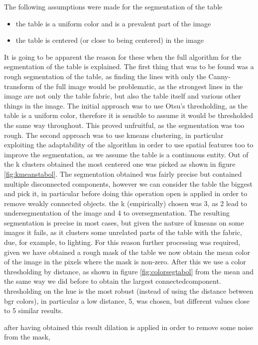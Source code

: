 The following assumptions were made for the segmentation of the table
\begin{itemize}
    \item the table is a uniform color and is a prevalent part of the image
    \item the table is centered (or close to being centered) in the image
\end{itemize}

It is going to be apparent the reason for these when the full algorithm for
the segmentation of the table is explained.
The first thing that was to be found was a rough segmentation of the table,
as finding the lines with only the Canny-transform of the full image would 
be problematic, as the strongest lines in the image are not only the table
fabric, but also the table itself and various other things in the image.
The initial approach was to use Otsu's thresholding, as the table is a uniform
color, therefore it is sensible to assume it would be thresholded the same
way throughout. This proved unfruitful, as the segmentation was too rough.
The second approach was to use kmeans clustering, in particular exploiting the
adaptability of the algorithm in order to use spatial features too to improve
the segmentation, as we assume the table is a continuous entity. Out of the k clusters obtained the most centered one was picked as shown in figure \ref{fig:kmeanstabol}.
The segmentation obtained was fairly precise but contained multiple disconnected
components, however we can consider the table the biggest and pick it, in particular
before doing this operation open is applied in order to remove weakly connected objects.
the k (empirically) chosen was 3, as 2 lead to undersegmentation of the image and 4 to oversegmentation.
The resulting segmentation is precise in most cases, but given the nature of kmeans on some
images it fails, as it clusters some unrelated parts of the table with the fabric, due,
for example, to lighting.
For this reason further processing was required, given we have obtained a rough mask of
the table we now obtain the mean color of the image in the pixels where the mask is non-zero.
After this we use a color thresholding by distance, as shown in figure \ref{fig:colorsegtabol} from the mean and the same way we 
did before to obtain the largest connectedcomponent. thresholding on the hue
is the most robust (instead of using the distance between bgr colors), in particular a low distance, 5, was chosen, but different values close to 5 similar results.\par
after having obtained this result dilation is applied in order to remove some noise from the mask,
